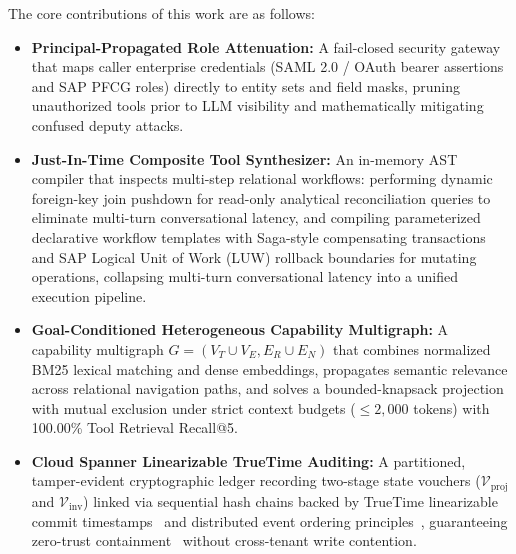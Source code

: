 \documentclass[conference,10pt]{IEEEtran}
\begin{document}
The core contributions of this work are as follows:
\begin{itemize}
    \item \textbf{Principal-Propagated Role Attenuation:} A fail-closed security gateway that maps caller enterprise credentials (SAML 2.0 / OAuth bearer assertions and SAP PFCG roles) directly to entity sets and field masks, pruning unauthorized tools prior to LLM visibility and mathematically mitigating confused deputy attacks.
    \item \textbf{Just-In-Time Composite Tool Synthesizer:} An in-memory AST compiler that inspects multi-step relational workflows: performing dynamic foreign-key join pushdown for read-only analytical reconciliation queries to eliminate multi-turn conversational latency, and compiling parameterized declarative workflow templates with Saga-style compensating transactions~\cite{garciamolina1987sagas, mohan1992aries} and SAP Logical Unit of Work (LUW) rollback boundaries for mutating operations, collapsing multi-turn conversational latency into a unified execution pipeline.
    \item \textbf{Goal-Conditioned Heterogeneous Capability Multigraph:} A capability multigraph $G = (V_T \cup V_E, E_R \cup E_N)$ that combines normalized BM25 lexical matching and dense embeddings, propagates semantic relevance across relational navigation paths, and solves a bounded-knapsack projection with mutual exclusion under strict context budgets ($\le 2{,}000$ tokens) with 100.00\% Tool Retrieval Recall@5.
    \item \textbf{Cloud Spanner Linearizable TrueTime Auditing:} A partitioned, tamper-evident cryptographic ledger recording two-stage state vouchers ($\mathcal{V}_{\text{proj}}$ and $\mathcal{V}_{\text{inv}}$) linked via sequential hash chains backed by TrueTime linearizable commit timestamps~\cite{corbett2013spanner} and distributed event ordering principles~\cite{lamport1978time}, guaranteeing zero-trust containment~\cite{nist2020zerotrust} without cross-tenant write contention.

\end{itemize}
\end{document}
